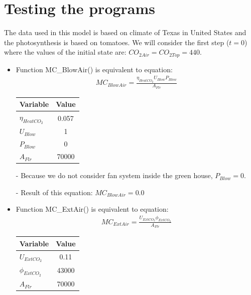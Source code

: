 \documentclass[a4paper]{article}
\numberwithin{equation}{section}
\begin{document}
\section{Testing the programs}
The data used in this model is based on climate of Texas in United States and the photosynthesis is based on tomatoes. We will consider the first step (\(t = 0\)) where the values of the initial state are: \(CO_{2Air} = CO_{2Top} = 440\).
\begin{itemize}
  \item Function MC\_BlowAir() is equivalent to equation:
        \begin{align*}
          MC_{BlowAir} = \frac{\eta_{HeatCO_2}U_{Blow}P_{Blow}}{A_{Flr}}
        \end{align*}

        \begin{table}[H]
          \centering
          \begin{tabular}{@{}lS@{}}
            \toprule
            \textbf{Variable}   & \textbf{Value} \\
            \midrule
            \(\eta_{HeatCO_2}\) & 0.057          \\
            \(U_{Blow}\)        & 1              \\
            \(P_{Blow}\)        & 0              \\
            \(A_{Flr}\)         & 70000          \\
            \bottomrule
          \end{tabular}
        \end{table}

  \item[-] Because we do not consider fan system inside the green house, \(P_{Blow} = 0\).
  \item[-] Result of this equation: \(MC_{BlowAir} = 0.0\)

  \item Function MC\_ExtAir() is equivalent to equation:
        \begin{align*}
          MC_{ExtAir} = \frac{U_{ExtCO_2}\phi_{ExtCO_2}}{A_{Flr}}
        \end{align*}

        \begin{table}[H]
          \centering
          \begin{tabular}{@{}lS@{}}
            \toprule
            \textbf{Variable}  & \textbf{Value} \\
            \midrule
            \(U_{ExtCO_2}\)    & 0.11           \\
            \(\phi_{ExtCO_2}\) & 43000          \\
            \(A_{Flr}\)        & 70000          \\
            \bottomrule
          \end{tabular}
        \end{table}


\end{itemize}
\end{document}
